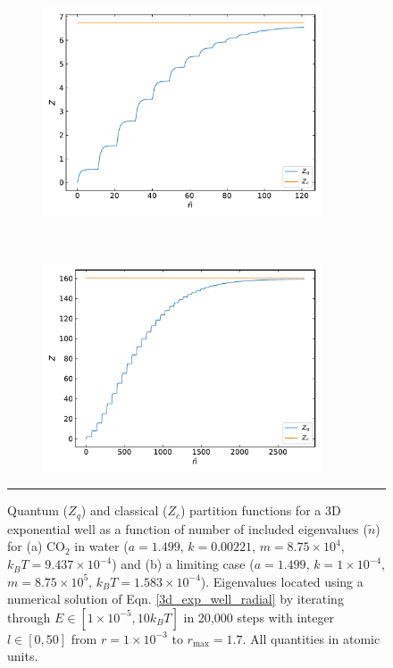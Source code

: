 \documentclass[../main.tex]{subfiles}
\begin{document}
\vspace{0.2cm}
\begin{figure}[h!]
	\begin{subfigure}[t]{0.5\textwidth}
		\centering
		\includegraphics[height=6.2cm]{4/figs/figX7/quantum_classical_comparison_co2.pdf}
		\caption{}
	\end{subfigure}%
	~ 
	\begin{subfigure}[t]{0.5\textwidth}
		\centering
		\includegraphics[height=6.2cm]{4/figs/figX7/quantum_classical_comparison_limiting.pdf}
		\caption{}
	\end{subfigure}
	\vspace{0.2cm}
	\hrule
	\caption{Quantum ($Z_q$) and classical ($Z_c$) partition functions for a 3D exponential well as a function of number of included eigenvalues ($\tilde{n}$) for (a) CO$_2$ in water ($a = 1.499$, $k=0.00221$, $m=8.75 \times 10^4$, $k_BT = 9.437 \times 10^{-4}$) and (b) a limiting case ($a = 1.499$, $k=1\times 10^{-4}$, $m=8.75 \times 10^5$, $k_BT = 1.583 \times 10^{-4}$). Eigenvalues located using a numerical solution of Eqn. \eqref{3d_exp_well_radial} by iterating through $E \in [1\times10^{-5}, 10 k_BT]$ in 20,000 steps with integer $l \in [0, 50]$ from $r = 1\times10^{-3}$ to $r_\text{max} = 1.7$. All quantities in atomic units. 
	} 
	\label{fig::entropy_X7}
\end{figure}
\end{document}
